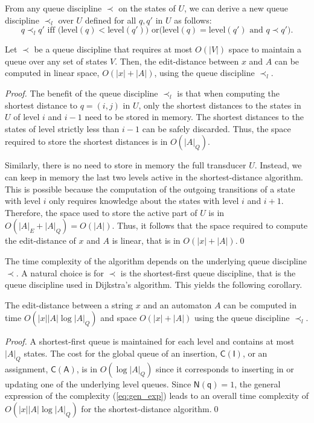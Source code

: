 \documentclass{llncs}
\newcommand{\0}{\overline{0}}
\newcommand{\1}{\overline{1}}
\newcommand{\+}{\oplus}
\renewcommand{\.}{\otimes}
\newcommand{\level}{\textrm{level}}
\begin{document}
From any queue discipline $\prec$ on the states of $U$, we can derive
a new queue discipline $\prec_l$ over $U$ defined for all $q, q'$ in
$U$ as follows:
\begin{equation}
\label{eq:queue}
q \prec_l q' \text{ iff $\bigl(\level(q) < \level(q')\bigr)$ or
$\bigl(\level(q) = \level(q')$ and $q \prec q'\bigr)$}.
\end{equation}

\begin{proposition}
\label{prop:algo}
Let $\prec$ be a queue discipline that requires at most $O(|V|)$ space
to maintain a queue over any set of states $V$. Then, the
edit-distance between $x$ and $A$ can be computed in linear space,
$O(|x|+|A|)$, using the queue discipline $\prec_l$.
\end{proposition}
\begin{proof}
  The benefit of the queue discipline $\prec_l$ is that when computing
  the shortest distance to $q = (i,j)$ in $U$, only the shortest
  distances to the states in $U$ of level $i$ and $i-1$ need to be
  stored in memory. The shortest distances to the states of level
  strictly less than $i - 1$ can be safely discarded. Thus, the space
  required to store the shortest distances is in $O(|A|_Q)$.
 
  Similarly, there is no need to store in memory the full transducer
  $U$. Instead, we can keep in memory the last two levels active in
  the shortest-distance algorithm. This is possible because the
  computation of the outgoing transitions of a state with level $i$
  only requires knowledge about the states with level $i$ and $i +
  1$. Therefore, the space used to store the active part of $U$ is in
  $O(|A|_E + |A|_Q) = O(|A|)$.  Thus, it follows that the space
  required to compute the edit-distance of $x$ and $A$ is linear, that
  is in $O(|x| + |A|)$.\qed
\end{proof}

The time complexity of the algorithm depends on the underlying queue
discipline $\prec$.  A natural choice is for $\prec$ is the
shortest-first queue discipline, that is the queue discipline used in
Dijkstra's algorithm. This yields the following corollary.
\begin{corollary}
\label{cor:cyclic}
The edit-distance between a string $x$ and an automaton $A$ can be
computed in time $O(|x| |A| \log |A|_Q)$ and space $O(|x| + |A|)$
using the queue discipline $\prec_l$.
\end{corollary}
\begin{proof}
  A shortest-first queue is maintained for each level and contains at
  most $|A|_Q$ states. The cost for the global queue of an insertion,
  $\mathsf{C(I)}$, or an assignment, $\mathsf{C(A)}$, is in $O(\log
  |A|_Q)$ since it corresponds to inserting in or updating one of the
  underlying level queues. Since $\mathsf{N(q)} = 1$, the general
  expression of the complexity (\ref{eq:gen_exp}) leads to an overall
  time complexity of $O(|x| |A| \log |A|_Q)$ for the shortest-distance
  algorithm.\qed
\end{proof}
\end{document}
